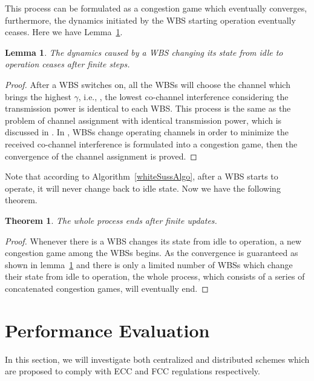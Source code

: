 \documentclass[times]{ettauth}
\newcommand{\ie}{i.e., }
\theoremstyle{mytheoremstyle}
\newtheorem{theorem}{Theorem}[section]
\theoremstyle{mytheoremstyle}
\theoremstyle{mytheoremstyle}
\newtheorem{lemma}{Lemma}[section]
\begin{document}
This process can be formulated as a congestion game which eventually converges, furthermore, the dynamics initiated by the WBS starting operation eventually ceases. 
Here we have Lemma~\ref{scheme2Lemma}.
\begin{lemma}
\label{scheme2Lemma}
\emph{The dynamics caused by a WBS changing its state from idle to operation ceases after finite steps.}
\end{lemma}
\begin{proof}
After a WBS switches on, all the WBSs will choose the channel which brings the highest $\gamma$, \ie, the lowest co-channel interference considering the transmission power is identical to each WBS.
This process is the same as the problem of channel assignment with identical transmission power, which is discussed in \cite{allerton08_liu}.
In \cite{allerton08_liu}, WBSs change operating channels in order to minimize the received co-channel interference is formulated into a congestion game, then the convergence of the channel assignment is proved.
\end{proof}

Note that according to Algorithm~\ref{whiteSussAlgo}, after a WBS starts to operate, it will never change back to idle state.
Now we have the following theorem.
\begin{theorem}
The whole process ends after finite updates.
\end{theorem}

\begin{proof}
Whenever there is a WBS changes its state from idle to operation, a new congestion game among the WBSs begins.
As the convergence is guaranteed as shown in lemma~\ref{scheme2Lemma} and there is only a limited number of WBSs which change their state from idle to operation, the whole process, which consists of a series of concatenated congestion games, will eventually end.
\end{proof}


	
	



\section{Performance Evaluation}
\label{simulation}
In this section, we will investigate both centralized and distributed schemes which are proposed to comply with ECC and FCC regulations respectively.
\end{document}
